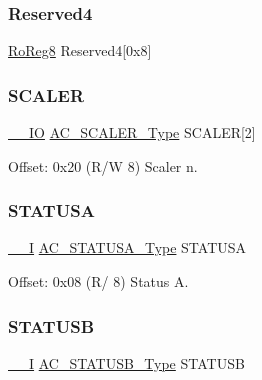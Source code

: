 \subsubsection{\texorpdfstring{Reserved4}{Reserved4}}
{\footnotesize\ttfamily \mbox{\hyperlink{group___s_a_m_d21_e15_a__definitions_ga0d957f1433aaf5d70e4dc2b68288442d}{Ro\+Reg8}} Reserved4\mbox{[}0x8\mbox{]}}

\mbox{\label{struct_ac_a29fbafe05122f7ccc3f4ef20e7eb39fe}} 
\subsubsection{\texorpdfstring{SCALER}{SCALER}}
{\footnotesize\ttfamily \mbox{\hyperlink{core__cm0plus_8h_aec43007d9998a0a0e01faede4133d6be}{\+\_\+\+\_\+\+IO}} \mbox{\hyperlink{union_a_c___s_c_a_l_e_r___type}{A\+C\+\_\+\+S\+C\+A\+L\+E\+R\+\_\+\+Type}} S\+C\+A\+L\+ER\mbox{[}2\mbox{]}}



Offset\+: 0x20 (R/W 8) Scaler n. 

\mbox{\label{struct_ac_a683e6f8c7abf8ee788efebe284dcd4f5}} 
\subsubsection{\texorpdfstring{STATUSA}{STATUSA}}
{\footnotesize\ttfamily \mbox{\hyperlink{core__cm0plus_8h_af63697ed9952cc71e1225efe205f6cd3}{\+\_\+\+\_\+I}} \mbox{\hyperlink{union_a_c___s_t_a_t_u_s_a___type}{A\+C\+\_\+\+S\+T\+A\+T\+U\+S\+A\+\_\+\+Type}} S\+T\+A\+T\+U\+SA}



Offset\+: 0x08 (R/ 8) Status A. 

\mbox{\label{struct_ac_a7afadd7a93198cb9d6037d382b5c2919}} 
\subsubsection{\texorpdfstring{STATUSB}{STATUSB}}
{\footnotesize\ttfamily \mbox{\hyperlink{core__cm0plus_8h_af63697ed9952cc71e1225efe205f6cd3}{\+\_\+\+\_\+I}} \mbox{\hyperlink{union_a_c___s_t_a_t_u_s_b___type}{A\+C\+\_\+\+S\+T\+A\+T\+U\+S\+B\+\_\+\+Type}} S\+T\+A\+T\+U\+SB}




